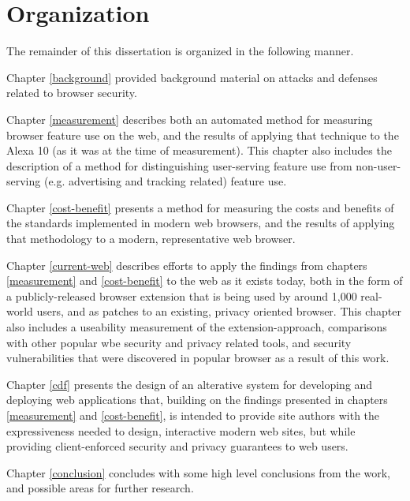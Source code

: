 \section{Organization}
\label{intro:organization}

The remainder of this dissertation is organized in the following manner.

Chapter \ref{background} provided background material on attacks and defenses
related to browser security.

Chapter \ref{measurement} describes both an automated method for measuring
browser feature use on the web, and the results of applying that technique
to the Alexa 10 (as it was at the time of measurement).  This chapter
also includes the description of a method for distinguishing user-serving
feature use from non-user-serving (e.g. advertising and tracking related)
feature use.

Chapter \ref{cost-benefit} presents a method for measuring the costs and
benefits of the \WAPI standards implemented in modern web browsers, and
the results of applying that methodology to a modern, representative web
browser.

Chapter \ref{current-web} describes efforts to apply the findings from
chapters \ref{measurement} and \ref{cost-benefit} to the web as it exists today,
both in the form of a publicly-released browser extension that is being
used by around 1,000 real-world users, and as patches to an existing, privacy
oriented browser.  This chapter also includes a useability measurement of the
extension-approach, comparisons with other popular wbe security and privacy
related tools, and security vulnerabilities that were discovered in popular
browser as a result of this work.

Chapter \ref{cdf} presents the design of an alterative system for developing
and deploying web applications that, building on the findings presented in
chapters \ref{measurement} and \ref{cost-benefit}, is intended to provide
site authors with the expressiveness needed to design, interactive modern web
sites, but while providing client-enforced security and privacy guarantees to
web users.

Chapter \ref{conclusion} concludes with some high level conclusions from the
work, and possible areas for further research.